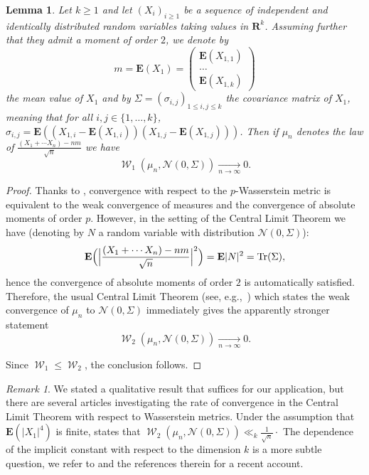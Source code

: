 \documentclass[12pt]{amsart}
\renewcommand{\mathcal}{\mathscr}
\newcommand{\Rr}{\mathbf{R}}
\newcommand{\expect}{\mathbf{E}}
\DeclareMathOperator{\wass}{\mathcal{W}}
\theoremstyle{plain}
\newtheorem{lemma}[theorem]{Lemma}
\theoremstyle{remark}
\newtheorem*{rem}{Remark}
\theoremstyle{definition}
\newcommand{\mcN}{\mathcal{N}}
\begin{document}
\begin{lemma}
  Let $k \geqslant 1$ and let $(X_i)_{i \geqslant 1}$ be a sequence of
  independent and identically distributed random variables taking
  values in $\Rr^k$. Assuming further that they admit a moment of
  order $2$, we denote by
$$
m = \expect(X_1) = \begin{pmatrix}
  \expect(X_{1,1}) \\
  \dots \\
  \expect(X_{1,k})
\end{pmatrix} 
$$
the mean value of $X_1$ and by
$\Sigma = (\sigma_{i,j})_{1 \leqslant i,j \leqslant k}$ the
covariance matrix of $X_1$, meaning that for all
$i,j \in \{1, \dots, k\}$,
$\sigma_{i,j} =\expect((X_{1,i} - \expect(X_{1,i}))(X_{1,j} -
\expect(X_{1,j})))$.  Then if $\mu_n$ denotes the law of
$\frac{(X_1 + \cdots X_n) - nm}{\sqrt{n}}$ we have
$$
\wass_1(\mu_n, \mcN(0, \Sigma)) \underset{n \to
  \infty}{\longrightarrow} 0.
$$
\end{lemma}

\begin{proof}
  Thanks to \cite[Th. 7.12]{villani}, convergence with respect to the
  $p$-Wasserstein metric is equivalent to the weak convergence of
  measures and the convergence of absolute moments of order
  $p$. However, in the setting of the Central Limit Theorem we have (denoting by $N$ a
  random variable with distribution $\mcN(0, \Sigma)$):
  $$
  \expect\Bigl(\Bigl| \frac{(X_1 + \cdots X_n) - nm}{\sqrt{n}}
  \Bigr|^2\Bigr) = \expect{|N|^2} = \mathrm{Tr}(\Sigma),
  $$
  hence the convergence of absolute moments of order $2$ is
  automatically satisfied. Therefore, the usual Central Limit Theorem
  (see, e.g.,~\cite[Th. 29.5]{billingsley}) which states the weak
  convergence of $\mu_n$ to $\mcN(0, \Sigma)$ immediately gives the
  apparently stronger statement
  $$
  \wass_2(\mu_n, \mcN(0, \Sigma)) \underset{n \to \infty}{\longrightarrow}
  0.
  $$

  Since $\wass_1 \leqslant \wass_2$, the conclusion follows.
\end{proof}

\begin{rem}
  We stated a qualitative result that suffices for our application,
  but there are several articles investigating the rate of convergence
  in the Central Limit Theorem with respect to Wasserstein
  metrics. Under the assumption that $\expect(|X_1|^4)$ is finite,
  \cite[Th.\,1]{bonis20} states that
  $\wass_2(\mu_n, \mcN(0, \Sigma)) \ll_k \frac{1}{\sqrt{n}}\cdot$ The
  dependence of the implicit constant with respect to the dimension
  $k$ is a more subtle question, we refer to \cite{bonis24} and the
  references therein for a recent account.
\end{rem}
\end{document}

